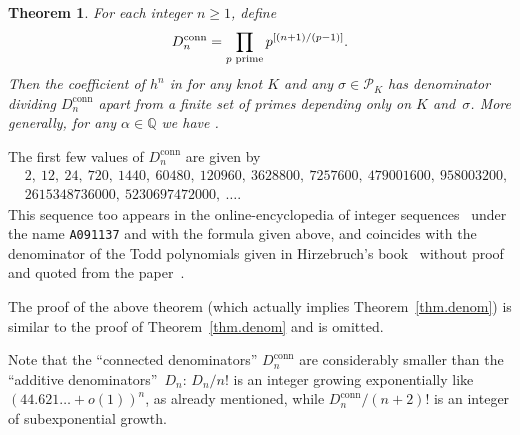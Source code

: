 \documentclass[pdftex]{sigma}
\numberwithin{equation}{section}
\newtheorem{Theorem}{Theorem}[section]
\def\calP{\mathcal P}
\def\calP{\mathcal P}
\def\a{\alpha}
\def\Q{\mathbb Q}
\def\a{\alpha}
\def\s{\sigma}
\def\conn{^\mathrm{conn}}
\begin{document}
\begin{Theorem}
\label{thm.denomc}
For each integer $n\ge1$, define
\[%
D_n\conn = \prod_{\text{$p$ {\rm prime}}} p^{[(n+1)/(p-1)]}  .
\]
Then the coefficient of $h^n$ in \smash{$\log\Phi_0^{(K,\s)}(h)$} for any knot $K$ and
any $\s\in\calP_K$ has denominator dividing $D_n\conn$ apart from a finite set
of primes depending only on $K$ and~$\s$. More generally, for any $\a\in\Q$ we
have \smash{$\Phi_\a^{(K,\s)}(h)\in R\otimes\exp\bigl(\sum_{n\ge1} R h^n/D_n\conn\bigr)
\subset R_D[[h]]$}.
\end{Theorem}

The first few values of $D_n\conn$ are given by
\begin{align*}\label{Dnconnvalues}
&   2, \ 12, \ 24, \ 720, \ 1440, \ 60480, \ 120960, \ 3628800, \ 7257600, \ 479001600, \
958003200, \\ &   2615348736000, \ 5230697472000, \ \dots.
\end{align*}
This sequence too appears in the online-encyclopedia of integer
sequences~\cite{OEIS} under the name \texttt{A091137} and with the formula given
above, and coincides with the denominator of the Todd polynomials given in
Hirzebruch's book~\cite[Lemmas~1.5.2 and~1.7.3]{Hirzebruch}
without proof and quoted from the paper~\cite{Atiyah-Hirzebruch}.

The proof of the above theorem (which actually implies Theorem~\ref{thm.denom})
is similar to the proof of Theorem~\ref{thm.denom} and is omitted.

Note that the ``connected denominators'' $D_n\conn$ are considerably smaller than
the ``additive denominators''~$D_n $: $ D_n/n!$ is an integer growing exponentially
like $(44.621{\dots}+o(1))^n$, as already mentioned, while $D_n\conn/(n+2)!$
is an integer of subexponential growth.
\end{document}
